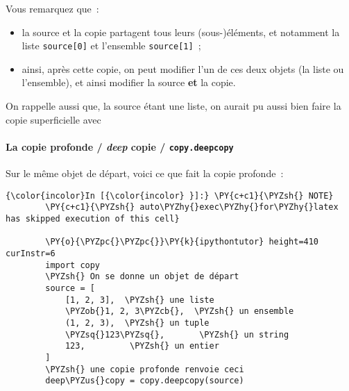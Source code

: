     Vous remarquez que~:

\begin{itemize}
\tightlist
\item
  la source et la copie partagent tous leurs (sous-)éléments, et
  notamment la liste \texttt{source{[}0{]}} et l'ensemble
  \texttt{source{[}1{]}}~;
\item
  ainsi, après cette copie, on peut modifier l'un de ces deux objets (la
  liste ou l'ensemble), et ainsi modifier la source \textbf{et} la
  copie.
\end{itemize}

    On rappelle aussi que, la source étant une liste, on aurait pu aussi
bien faire la copie superficielle avec

\begin{Shaded}
\begin{Highlighting}[frame=lines,framerule=0.6mm,rulecolor=\color{asisframecolor}]
\OperatorTok{=}
\end{Highlighting}
\end{Shaded}

    \hypertarget{la-copie-profonde-deep-copie-copy.deepcopy}{%
\paragraph{\texorpdfstring{La copie profonde / \emph{deep} copie /
\texttt{copy.deepcopy}}{La copie profonde / deep copie / copy.deepcopy}}\label{la-copie-profonde-deep-copie-copy.deepcopy}}

    Sur le même objet de départ, voici ce que fait la copie profonde~:

    \begin{Verbatim}[commandchars=\\\{\},frame=single,framerule=0.3mm,rulecolor=\color{cellframecolor}]
{\color{incolor}In [{\color{incolor} }]:} \PY{c+c1}{\PYZsh{} NOTE}
        \PY{c+c1}{\PYZsh{} auto\PYZhy{}exec\PYZhy{}for\PYZhy{}latex has skipped execution of this cell}
        
        \PY{o}{\PYZpc{}\PYZpc{}}\PY{k}{ipythontutor} height=410 curInstr=6
        import copy
        \PYZsh{} On se donne un objet de départ
        source = [
            [1, 2, 3],  \PYZsh{} une liste
            \PYZob{}1, 2, 3\PYZcb{},  \PYZsh{} un ensemble
            (1, 2, 3),  \PYZsh{} un tuple
            \PYZsq{}123\PYZsq{},       \PYZsh{} un string
            123,         \PYZsh{} un entier
        ]
        \PYZsh{} une copie profonde renvoie ceci
        deep\PYZus{}copy = copy.deepcopy(source)
\end{Verbatim}


